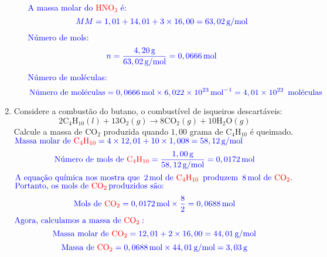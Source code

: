 \documentclass[a4paper, 12pt]{article}
\begin{document}
\begin{enumerate}
\begin{enumerate}[align=left, labelsep=-0.5em]
                    \\[10pt]
                    \textcolor{blue}{A massa molar do \textcolor{red}{\(\text{HNO}_{3}\)} é:}
                    \[
                        \textcolor{blue}{\text{$MM$} = 1,01 + 14,01 + 3 \times 16,00 = 63,02 \, \text{g/mol}}
                    \]
                    \textcolor{blue}{Número de mols:}
                    \[
                        \textcolor{blue}{n = \frac{4,20 \, \text{g}}{63,02 \, \text{g/mol}} = 0,0666 \, \text{mol}}
                    \]
                    \textcolor{blue}{Número de moléculas:}
                    \[
                        \textcolor{blue}{\text{Número de moléculas} = 0,0666 \, \text{mol} \times 6,022 \times 10^{23} \, \text{mol}^{-1} = 4,01 \times 10^{22} \, \text{ moléculas}}
                    \]
          \end{enumerate}


    \item Considere a combustão do butano, o combustível de isqueiros
          descartáveis:
          \[
              2\text{C}_{4}\text{H}_{10}(l) + 13\text{O}_{2}(g) \rightarrow 8\text{CO}_{2}
              (g) + 10\text{H}_{2}\text{O}(g)
          \]
          Calcule a massa de $\text{CO}_{2}$ produzida quando $1,00$ grama de $\text{C}
              _{4}\text{H}_{10}$ é queimado.
          \\[10pt]
          $\textcolor{blue}{\text{Massa molar de \textcolor{red}{\(\text{C}_4\text{H}_{10}\)}} = 4 \times 12,01 + 10 \times 1,008 = 58,12 \, \text{g/mol}}$
          \[
              \textcolor{blue}{\text{Número de mols de \textcolor{red}{\(\text{C}_4\text{H}_{10}\)}} = \frac{1,00 \, \text{g}}{58,12 \, \text{g/mol}} = 0,0172 \, \text{mol}}
          \]
          $\textcolor{blue}{\text{A equação química nos mostra que } \, 2 \, \text{mol de \textcolor{red}{\(\text{C}_4\text{H}_{10}\)}} \, \text{ produzem } \, 8 \, \text{mol de \textcolor{red}{\(\text{CO}_2\)}}.}$
          \\[10pt]
          $\textcolor{blue}{\text{Portanto, os mols de \textcolor{red}{\(\text{CO}_2\)}} \, \text{produzidos são:}}$
          \[
              \textcolor{blue}{\text{Mols de \textcolor{red}{\(\text{CO}_2\)}} = 0,0172 \, \text{mol} \times \frac{8}{2} = 0,0688 \, \text{mol}}
          \]
          $\textcolor{blue}{\text{Agora, calculamos a massa de \textcolor{red}{\(\text{CO}_2\)}}:}$
          \[
              \textcolor{blue}{\text{Massa molar de \textcolor{red}{\(\text{CO}_2\)}} = 12,01 + 2 \times 16,00 = 44,01 \, \text{g/mol}}
          \]
          \[
              \textcolor{blue}{\text{Massa de \textcolor{red}{\(\text{CO}_2\)}} = 0,0688 \, \text{mol} \times 44,01 \, \text{g/mol} = 3,03 \, \text{g}}
          \]




\end{enumerate}
\end{document}

